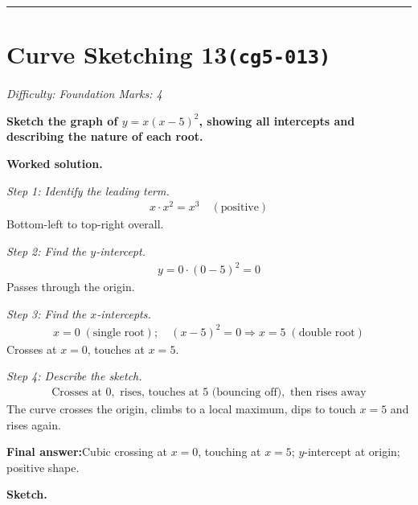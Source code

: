 \documentclass[11pt]{article}
\newcommand{\question}[1]{\par\medskip\noindent\textbf{#1}\par}
\begin{document}
\medskip\hrule

\section*{Curve Sketching 13\quad\small\texttt{(cg5-013)}}
\textit{Difficulty: Foundation \quad\textbar\quad Marks: 4}

\question{Sketch the graph of \( y = x(x - 5)^2 \), showing all intercepts and describing the nature of each root.}

\textbf{Worked solution.}

\textit{Step 1: Identify the leading term.}
\[\begin{gathered}
x \cdot x^2 = x^3 \quad (\text{positive})
\end{gathered}\]
Bottom-left to top-right overall.

\textit{Step 2: Find the \( y \)-intercept.}
\[\begin{gathered}
y = 0 \cdot (0-5)^2 = 0
\end{gathered}\]
Passes through the origin.

\textit{Step 3: Find the \( x \)-intercepts.}
\[\begin{gathered}
x = 0 \;(\text{single root}); \quad (x-5)^2 = 0 \Rightarrow x = 5 \;(\text{double root})
\end{gathered}\]
Crosses at \( x = 0 \), touches at \( x = 5 \).

\textit{Step 4: Describe the sketch.}
\[\begin{gathered}
\text{Crosses at } 0, \text{ rises, touches at } 5 \text{ (bouncing off)}, \text{ then rises away}
\end{gathered}\]
The curve crosses the origin, climbs to a local maximum, dips to touch \( x = 5 \) and rises again.

\begin{answerbox}
\textbf{Final answer:}\quad Cubic crossing at \(\displaystyle x = 0\), touching at \(\displaystyle x = 5\); \(\displaystyle y\)-intercept at origin; positive shape.
\end{answerbox}
\textbf{Sketch.}
\end{document}
